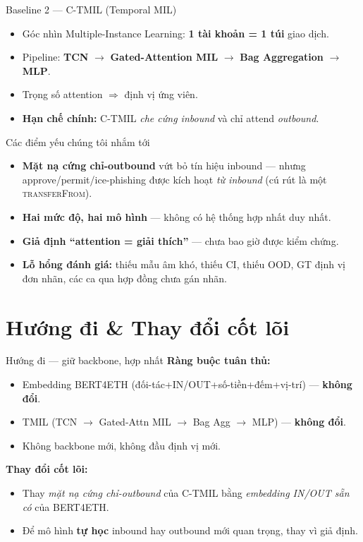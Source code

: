 \documentclass[aspectratio=169,10pt]{beamer}
\begin{document}
\begin{frame}{Baseline 2 --- C-TMIL (Temporal MIL)}
\begin{itemize}
\item Góc nhìn Multiple-Instance Learning: \textbf{1 tài khoản = 1 túi} giao dịch.
\item Pipeline: \textbf{TCN} $\to$ \textbf{Gated-Attention MIL} $\to$ \textbf{Bag Aggregation} $\to$ \textbf{MLP}.
\item Trọng số attention $\Rightarrow$ định vị ứng viên.
\item \textbf{Hạn chế chính:} C-TMIL \emph{che cứng inbound} và chỉ attend \emph{outbound}.
\end{itemize}
\end{frame}

\begin{frame}{Các điểm yếu chúng tôi nhắm tới}
\begin{itemize}
\item \textbf{Mặt nạ cứng chỉ-outbound} vứt bỏ tín hiệu inbound --- nhưng approve/permit/ice-phishing được kích hoạt \emph{từ inbound} (cú rút là một \textsc{transferFrom}).
\item \textbf{Hai mức độ, hai mô hình} --- không có hệ thống hợp nhất duy nhất.
\item \textbf{Giả định ``attention = giải thích''} --- chưa bao giờ được kiểm chứng.
\item \textbf{Lỗ hổng đánh giá:} thiếu mẫu âm khó, thiếu CI, thiếu OOD, GT định vị đơn nhãn, các ca qua hợp đồng chưa gán nhãn.
\end{itemize}
\end{frame}

\section{Hướng đi \& Thay đổi cốt lõi}
\begin{frame}{Hướng đi --- giữ backbone, hợp nhất}
\textbf{Ràng buộc tuân thủ:}
\begin{itemize}
\item Embedding BERT4ETH (đối-tác+IN/OUT+số-tiền+đếm+vị-trí) --- \textbf{không đổi}.
\item TMIL (TCN $\to$ Gated-Attn MIL $\to$ Bag Agg $\to$ MLP) --- \textbf{không đổi}.
\item Không backbone mới, không đầu định vị mới.
\end{itemize}
\vfill
\textbf{Thay đổi cốt lõi:}
\begin{itemize}
\item Thay \emph{mặt nạ cứng chỉ-outbound} của C-TMIL bằng \emph{embedding IN/OUT sẵn có} của BERT4ETH.
\item Để mô hình \textbf{tự học} inbound hay outbound mới quan trọng, thay vì giả định.
\end{itemize}
\end{frame}
\end{document}
